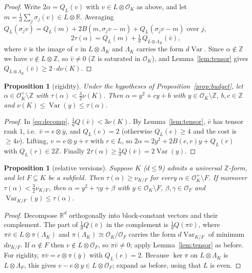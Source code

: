 \documentclass[11pt]{amsart}
\newtheorem{proposition}[theorem]{Proposition}
\theoremstyle{definition}
\DeclareMathOperator{\Var}{Var}
\newcommand{\OK}{\mathcal{O}_K}
\newcommand{\OF}{\mathcal{O}_F}
\newcommand{\Z}{\mathbb{Z}}
\newcommand{\R}{\mathbb{R}}
\newcommand{\LamK}{\Lambda_K}
\newcommand{\nurel}{\nu_{K/F}}
\begin{document}
\begin{proof}
Write $2\alpha=Q_L(v)$ with $v\in L\otimes\OK$ as above, and let $m=\frac1d\sum_j\sigma_j(v)\in
L\otimes\R$.  Averaging $Q_L(\sigma_jv)=Q_L(m)+2B(m,\sigma_jv-m)+Q_L(\sigma_jv-m)$ over $j$,
\begin{equation}\label{eq:decomp}
2\tau(\alpha)=Q_L(m)+\tfrac1d\,Q_{L\otimes\LamK}(\bar v),
\end{equation}
where $\bar v$ is the image of $v$ in $L\otimes\LamK$ and $\LamK$ carries the form $d\Var$.
Since $\alpha\notin\Z$ we have $v\notin L\otimes\Z$, so $\bar v\ne0$ ($\Z$ is saturated in
$\OK$), and Lemma~\ref{lem:tensor} gives $Q_{L\otimes\LamK}(\bar v)\ge 2\cdot d\nu(K)$.
\end{proof}

\begin{proposition}[rigidity]\label{prop:rigidity}
Under the hypotheses of Proposition~\ref{prop:budget}, let $\alpha\in\OK^+\setminus\Z$ with
$\tau(\alpha)<\frac32\nu(K)$.  Then $\alpha=y^2+cy+b$ with $y\in\OK\setminus\Z$, $b,c\in\Z$ and
$\nu(K)\le\Var(y)\le\tau(\alpha)$.
\end{proposition}

\begin{proof}
In \eqref{eq:decomp}, $\frac1dQ(\bar v)<3\nu(K)$.  By Lemma~\ref{lem:tensor}, $\bar v$ has
tensor rank $1$, i.e.\ $\bar v=e\otimes\bar y$, and $Q_L(e)=2$ (otherwise $Q_L(e)\ge4$ and the
cost is $\ge4\nu$).  Lifting, $v=e\otimes y+r$ with $r\in L$, so
$2\alpha=2y^2+2B(e,r)y+Q_L(r)$ with $Q_L(r)\in2\Z$.  Finally $2\tau(\alpha)\ge\frac1dQ(\bar v)=
2\Var(y)$.
\end{proof}

\begin{proposition}[relative versions]\label{prop:relative}
Suppose $K$ ($d\le 9$) admits a universal $\Z$-form, and let $F\subsetneq K$ be a subfield.
Then $\tau(\alpha)\ge\nurel$ for every $\alpha\in\OK^+\setminus F$.  If moreover
$\tau(\alpha)<\frac32\nurel$, then $\alpha=y^2+\gamma y+\beta$ with $y\in\OK\setminus F$,
$\beta,\gamma\in\OF$ and $\Var_{K/F}(y)\le\tau(\alpha)$.
\end{proposition}

\begin{proof}
Decompose $\R^d$ orthogonally into block-constant vectors and their complement.  The part
of $\frac1dQ(\bar v)$ in the complement is $\frac1dQ(\pi\bar v)$, where $\pi\bar v\in
L\otimes\pi(\LamK)$ and $\pi(\LamK)\cong\OK/\OF$ carries the form $d\Var_{K/F}$ of minimum
$d\nurel$.  If $\alpha\notin F$ then $v\notin L\otimes\OF$, so $\pi\bar v\neq0$; apply
Lemma~\ref{lem:tensor} as before.  For rigidity, $\pi\bar v=e\otimes\pi(\bar y)$ with
$Q_L(e)=2$.  Because $\ker\pi$ on $L\otimes\LamK$ is $L\otimes\Lambda_F$, this gives
$v-e\otimes y\in L\otimes\OF$; expand as before, using that $L$ is even.
\end{proof}
\end{document}
